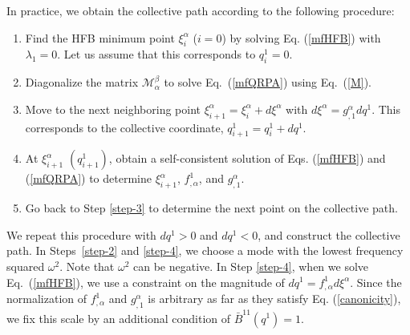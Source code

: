 \documentclass[11pt]{book} %
\begin{document}
In practice, we obtain the collective path according to the following procedure:
\begin{enumerate}
\item Find the HFB minimum point $\xi^\alpha_i$ ($i=0$)
	by solving Eq. (\ref{mfHFB}) with $\lambda_1=0$.
	Let us assume that this corresponds to $q^1_i=0$.
\item \label{step-2}
	Diagonalize the matrix $\mathcal{M}^{\beta}_{\alpha}$
to solve Eq.~(\ref{mfQRPA}) using Eq.~(\ref{M}).
\item \label{step-3}
Move to the next neighboring point
$\xi^\alpha_{i+1}=\xi^\alpha_{i}+d\xi^\alpha$
with $d\xi^{\alpha}=g^{\alpha}_{,1}dq^1$.
This corresponds to the collective coordinate, $q^1_{i+1}=q^1_i+dq^1$.
\item \label{step-4}
At $\xi_{i+1}^\alpha$ $(q^1_{i+1})$,
obtain a self-consistent solution of
Eqs. (\ref{mfHFB}) and (\ref{mfQRPA})
to determine
$\xi^\alpha_{i+1}$, $f^1_{,\alpha}$, and $g^\alpha_{,1}$.
\item Go back to Step \ref{step-3} to determine the next point
on the collective path.
\end{enumerate}
We repeat this procedure with $dq^1 > 0$ and $dq^1<0$, and
construct the collective path.
In Steps~\ref{step-2} and \ref{step-4}, we choose a mode
with the lowest frequency squared $\omega^2$.
Note that $\omega^2$ can be negative.
In Step \ref{step-4}, when we solve Eq.~(\ref{mfHFB}), we use
a constraint on the magnitude of $dq^1=f^1_{,\alpha}d\xi^{\alpha}$.
Since the normalization of $f^1_{,\alpha}$ and $g^\alpha_{,1}$ is
arbitrary as far as they satisfy Eq. (\ref{canonicity}),
we fix this scale by an additional condition of $\bar{B}^{11}(q^1)=1$.
\end{document}
